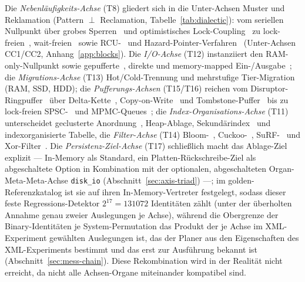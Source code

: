 \begin{nurkurz}
Die \emph{Nebenläufigkeits-Achse} (T8) gliedert sich in die Unter-Achsen Muster und Reklamation (Pattern $\perp$
Reclamation, Tabelle~\ref{tab:dialectic}): vom seriellen Nullpunkt über grobes Sperren~\cite{dijkstra1965concurrent}
und optimistisches Lock-Coupling~\cite{leis2016olc} zu lock-freien~\cite{michael1996queue},
wait-freien~\cite{herlihy1991waitfree} sowie RCU-~\cite{mckenney2001rcu} und
Hazard-Pointer-Verfahren~\cite{michael2004hazard} (Unter-Achsen CC1/CC2, Anhang~\ref{app:blocks}). Die
\emph{I/O-Achse} (T12) instanziiert den RAM-only-Nullpunkt sowie gepufferte~\cite{stonebraker1981os}, direkte
und memory-mapped Ein-/Ausgabe~\cite{crotty2022mmap}; die \emph{Migrations-Achse} (T13) Hot/Cold-Trennung und
mehrstufige Tier-Migration (RAM, SSD, HDD); die \emph{Pufferungs-Achsen} (T15/T16) reichen vom
Disruptor-Ringpuffer~\cite{thompson2011disruptor} über Delta-Kette~\cite{levandoski2013bwtree},
Copy-on-Write~\cite{driscoll1989persistent} und Tombstone-Puffer~\cite{oneil1996lsm} bis zu lock-freien
SPSC-~\cite{lamport_spsc} und MPMC-Queues~\cite{michael1996queue}; die \emph{Index-Organisations-Achse} (T11)
unterscheidet geclusterte Anordnung~\cite{bayer1972btree}, Heap-Ablage, Sekundärindex~\cite{comer1979btree} und
indexorganisierte Tabelle, die \emph{Filter-Achse} (T14) Bloom-~\cite{bloom1970}, Cuckoo-~\cite{fan2014cuckoo},
SuRF-~\cite{zhang2018surf} und Xor-Filter~\cite{graf2020xor}. Die \emph{Persistenz-Ziel-Achse}
(T17) schließlich macht das Ablage-Ziel explizit --- In-Memory als Standard, ein
Platten-Rückschreibe-Ziel als abgeschaltete Option in Kombination mit der optionalen, abgeschalteten
Organ-Meta-Meta-Achse \texttt{disk\_io} (Abschnitt~\ref{sec:axis-triad}) ---; im golden-Referenzkatalog
ist sie auf ihren In-Memory-Vertreter festgelegt, sodass dieser feste Regressions-Detektor $2^{17} = 131072$
Identitäten zählt (unter der überholten Annahme genau zweier Auslegungen je Achse), während die Obergrenze der
Binary-Identitäten je System-Permutation das Produkt der je Achse im XML-Experiment gewählten Auslegungen ist,
das der Planer aus den Eigenschaften des XML-Experiments bestimmt und das erst zur Ausführung bekannt ist
(Abschnitt~\ref{sec:mess-chain}). Diese Rekombination wird in
der Realität nicht erreicht, da nicht alle Achsen-Organe miteinander kompatibel sind.
\end{nurkurz}

